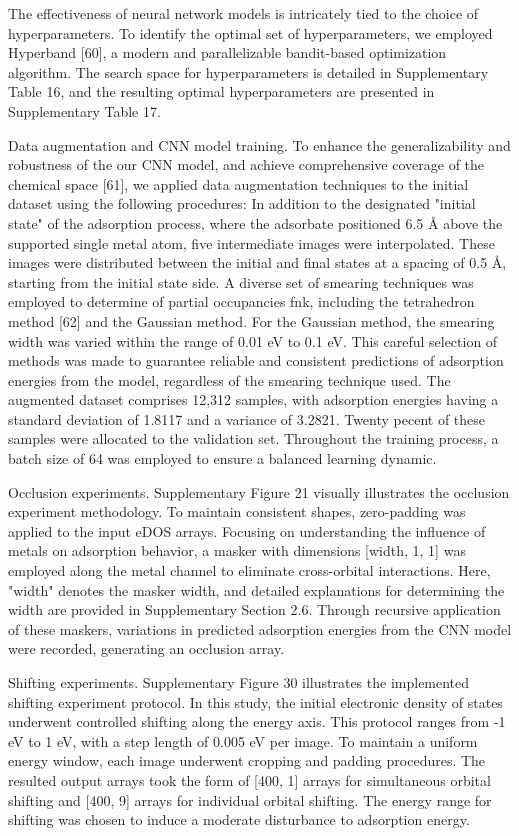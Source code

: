 The effectiveness of neural network models is intricately tied to the choice of hyperparameters. To identify the optimal set of hyperparameters, we employed Hyperband [60], a modern and parallelizable bandit-based optimization algorithm. The search space for hyperparameters is detailed in Supplementary Table 16, and the resulting optimal hyperparameters are presented in Supplementary Table 17.


Data augmentation and CNN model training.
To enhance the generalizability and robustness of the our CNN model, and achieve comprehensive coverage of the chemical space [61], we applied data augmentation techniques to the initial dataset using the following procedures:
	In addition to the designated "initial state" of the adsorption process, where the adsorbate positioned 6.5 Å above the supported single metal atom, five intermediate images were interpolated. These images were distributed between the initial and final states at a spacing of 0.5 Å, starting from the initial state side.
	A diverse set of smearing techniques was employed to determine of partial occupancies fnk, including the tetrahedron method [62] and the Gaussian method. For the Gaussian method, the smearing width was varied within the range of 0.01 eV to 0.1 eV. This careful selection of methods was made to guarantee reliable and consistent predictions of adsorption energies from the model, regardless of the smearing technique used.
The augmented dataset comprises 12,312 samples, with adsorption energies having a standard deviation of 1.8117 and a variance of 3.2821. Twenty pecent of these samples were allocated to the validation set. Throughout the training process, a batch size of 64 was employed to ensure a balanced learning dynamic.


Occlusion experiments.
Supplementary Figure 21 visually illustrates the occlusion experiment methodology. To maintain consistent shapes, zero-padding was applied to the input eDOS arrays. Focusing on understanding the influence of metals on adsorption behavior, a masker with dimensions [width, 1, 1] was employed along the metal channel to eliminate cross-orbital interactions. Here, "width" denotes the masker width, and detailed explanations for determining the width are provided in Supplementary Section 2.6. Through recursive application of these maskers, variations in predicted adsorption energies from the CNN model were recorded, generating an occlusion array.


Shifting experiments.
Supplementary Figure 30 illustrates the implemented shifting experiment protocol. In this study, the initial electronic density of states underwent controlled shifting along the energy axis. This protocol ranges from -1 eV to 1 eV, with a step length of 0.005 eV per image. To maintain a uniform energy window, each image underwent cropping and padding procedures. The resulted output arrays took the form of [400, 1] arrays for simultaneous orbital shifting and [400, 9] arrays for individual orbital shifting. The energy range for shifting was chosen to induce a moderate disturbance to adsorption energy.


